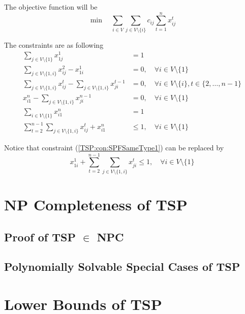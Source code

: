 					The objective function will be
					\begin{equation}
						\min \quad \sum_{i \in V}\sum_{j \in V\setminus \{i\}} c_{ij} \sum_{t = 1}^n x_{ij}^t
					\end{equation}

					The constraints are as following
					\begin{align}
						\sum_{j \in V \setminus \{1\}} x_{1j}^1 &= 1 \label{TSP:con:SPFStart}\\
						\sum_{j \in V \setminus \{1, i\}} x_{ij}^2 - x_{1i}^1 &= 0, \quad \forall i \in V \setminus \{1\} \label{TSP:con:SPFFirstLayer}\\
						\sum_{j \in V \setminus \{1, i\}} x_{ij}^t - \sum_{j \in V \setminus \{1, i\}} x_{ji}^{t - 1} &= 0, \quad \forall i \in V \setminus \{i\}, t \in \{2, \dots, n - 1\} \label{TSP:con:SPFTthLayer}\\
						x_{i1}^n - \sum_{j \in V \setminus \{1, i\}} x_{ji}^{n - 1} &= 0, \quad \forall i \in V \setminus \{1\} \label{TSP:con:SPFLastLayer}\\
						\sum_{i \in V \setminus \{1\}} x_{i1}^n &= 1 \label{TSP:con:SPFEnd}\\
						\sum_{t = 2}^{n - 1}\sum_{j \in V \setminus \{1, i\}} x_{ij}^t + x_{i1}^n & \le 1, \quad \forall i \in V \setminus \{1\} \label{TSP:con:SPFSameType1}
					\end{align}

					Notice that constraint (\ref{TSP:con:SPFSameType1}) can be replaced by
					\begin{equation}
						x_{1i}^1 + \sum_{t = 2}^{n - 1}\sum_{j \in V \setminus \{1, i\}} x_{ji}^t \le 1, \quad \forall i \in V \setminus \{1\} \label{TSP:con:SPFSameType2}
					\end{equation}

			\section{NP Completeness of TSP}
				\subsection{Proof of TSP $\in$ NPC}

				\subsection{Polynomially Solvable Special Cases of TSP}

			\section{Lower Bounds of TSP}
